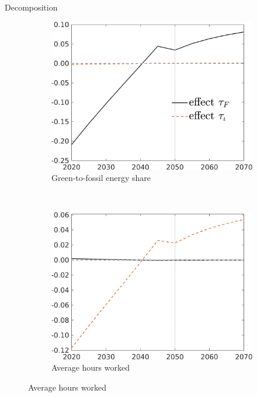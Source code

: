 \documentclass[11pt,aspectratio=169]{beamer}
\begin{document}
\begin{frame}{Decomposition}
		\hypertarget{decomp}{}
	\centering
	
	\begin{figure}[h!!]
		\centering
		\begin{subfigure}{0.4\textwidth}		
			\caption{\normalsize{Green-to-fossil energy share}}
			\includegraphics[width=1\textwidth]{../codding_model/own_basedOnFried/optimalPol_010922_revision/figures/all_13Sept22_Tplus30/CountTAUF_Both_Opt_target_GFF_nsk0_xgr0_knspil0_regime4_spillover0_sep0_extern0_PV1_etaa0.79_lgd1.png}
		\end{subfigure}
		\begin{minipage}[]{0.1\textwidth}
			\
		\end{minipage}
		\begin{subfigure}{0.4\textwidth}		
			\caption{\normalsize{Average hours worked}}
			\includegraphics[width=1\textwidth]{../codding_model/own_basedOnFried/optimalPol_010922_revision/figures/all_13Sept22_Tplus30/CountTAUF_Both_Opt_target_Hagg_nsk0_xgr0_knspil0_regime4_spillover0_sep0_extern0_PV1_etaa0.79_lgd0.png}

\end{subfigure}
\end{figure}
\end{frame}
\end{document}
